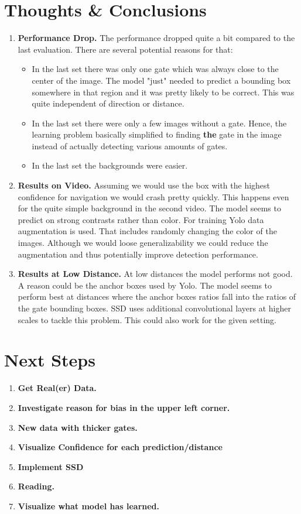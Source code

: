 \documentclass{article}
\begin{document}
\section{Thoughts \& Conclusions}
\begin{enumerate}
	\item \textbf{Performance Drop.} The performance dropped quite a bit compared to the last evaluation. There are several potential reasons for that:
	\begin{itemize}
		\item In the last set there was only one gate which was always close to the center of the image. The model "just" needed to predict a bounding box somewhere in that region and it was pretty likely to be correct. This was quite independent of direction or distance.
		\item In the last set there were only a few images without a gate. Hence, the learning problem basically simplified to finding \textbf{the} gate in the image instead of actually detecting various amounts of gates.
		\item In the last set the backgrounds were easier.
	\end{itemize} 
	
	\item \textbf{Results on Video.} Assuming we would use the box with the highest confidence for navigation we would crash pretty quickly. This happens even for the quite simple background in the second video. The model seems to predict on strong contrasts rather than color. For training Yolo data augmentation is used. That includes randomly changing the color of the images. Although we would loose generalizability we could reduce the augmentation and thus potentially improve detection performance.
	
	\item \textbf{Results at Low Distance.} At low distances the model performs not good. A reason could be the anchor boxes used by Yolo. The model seems to perform best at distances where the anchor boxes ratios fall into the ratios of the gate bounding boxes. SSD uses additional convolutional layers at higher scales to tackle this problem. This could also work for the given setting.  
\end{enumerate}
\section{Next Steps}
\begin{enumerate}
		\item \textbf{Get Real(er) Data.}
		\item \textbf{Investigate reason for bias in the upper left corner.}
		\item \textbf{New data with thicker gates.}
		\item \textbf{Visualize Confidence for each prediction/distance}
		\item \textbf{Implement SSD}
		\item \textbf{Reading.}
		\item \textbf{Visualize what model has learned.}
\end{enumerate}
\end{document}
